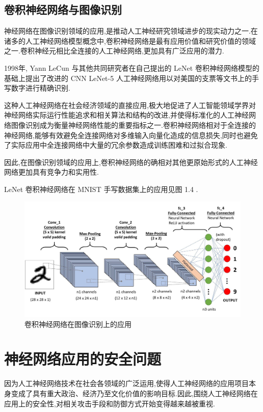 \section{卷积神经网络与图像识别}

神经网络在图像识别领域的应用,是推动人工神经研究领域进步的现实动力之一.在诸多的人工神经网络模型概念中,卷积神经网络是最有应用价值和研究价值的领域之一.卷积神经元相比全连接的人工神经网络,更加具有广泛应用的潜力.

1998年, Yann LeCun 与其他共同研究者在自己提出的 LeNet 卷积神经网络模型的基础上提出了改进的 CNN LeNet-5 人工神经网络用以对美国的支票等文书上的手写数字进行精确识别.

这种人工神经网络在社会经济领域的直接应用,极大地促进了人工智能领域学界对神经网络实际运行性能追求和相关算法和结构的改进,并使得标准化的人工神经网络图像识别成为衡量神经网络性能的重要指标之一.卷积神经网络相对于全连接的神经网络,能够有效避免全连接网络对多维输入向量化造成的信息损失,同时也避免了实际应用中全连接网络中大量的冗余参数造成训练困难和过拟合现象.

因此,在图像识别领域的应用上,卷积神经网络的确相对其他更原始形式的人工神经网络更加具有竞争力和实用性.

LeNet 卷积神经网络在 MNIST 手写数据集上的应用见图 1.4 .

\begin{figure}[H]
	\centering
	\includegraphics[scale=0.2]{Figures/CNN2.jpg}
	\caption{卷积神经网络在图像识别上的应用}
\end{figure}

\chapter{神经网络应用的安全问题}

因为人工神经网络技术在社会各领域的广泛运用,使得人工神经网络的应用项目本身变成了具有重大政治、经济乃至文化价值的影响目标.因此,围绕人工神经网络在应用上的安全性,对相关攻击手段和防御方式开始变得越来越被重视.

